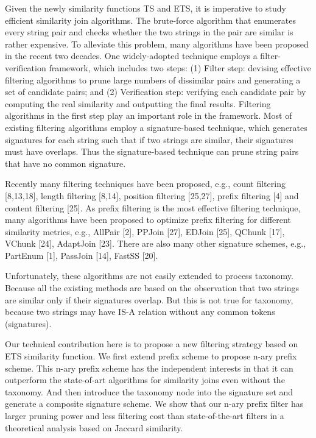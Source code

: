 Given the newly similarity functions TS and ETS, it is imperative to study efficient similarity join algorithms. The brute-force algorithm that enumerates every string pair and checks whether the two strings in the pair are similar is rather expensive. To alleviate this problem, many algorithms have been proposed in the recent two decades. One widely-adopted technique employs a filter-verification framework, which includes two steps: (1) Filter step: devising effective filtering algorithms to prune large numbers of dissimilar pairs and generating a set of candidate pairs; and (2) Verification step: verifying each candidate pair by computing
the real similarity and outputting the final results. Filtering algorithms in the first step play an important role
in the framework. Most of existing filtering algorithms employ a signature-based technique, which generates signatures for each string such that if two strings are similar, their signatures must have overlaps. Thus the signature-based technique can prune string pairs that have no common signature.

Recently many filtering techniques have been proposed, e.g., count filtering [8,13,18], length filtering [8,14], position
filtering [25,27], prefix filtering [4] and content filtering [25]. As prefix filtering is the most effective filtering technique,
many algorithms have been proposed to optimize prefix filtering for different similarity metrics, e.g., AllPair [2],
PPJoin [27], EDJoin [25], QChunk [17], VChunk [24], AdaptJoin [23]. There are also many other signature schemes, e.g., PartEnum [1],
PassJoin [14], FastSS [20].

Unfortunately, these algorithms are not easily extended to process taxonomy. Because all the existing methods are based on the observation that two strings are similar only if their signatures overlap. But this is not true for taxonomy, because two strings may have IS-A relation without any common tokens (signatures).

Our technical contribution here is to propose a new filtering strategy based on ETS similarity function. We first extend prefix scheme to propose n-ary prefix scheme. This n-ary prefix scheme has the independent interests in that it can outperform the state-of-art algorithms  for similarity joins even without the taxonomy. And then introduce the taxonomy node into the signature set and generate a composite signature scheme. We show that our n-ary prefix
filter has larger pruning power and less filtering cost
than state-of-the-art filters in a theoretical analysis based on Jaccard similarity.


